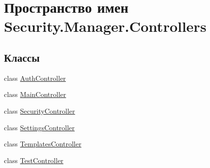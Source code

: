 \hypertarget{namespace_security_1_1_manager_1_1_controllers}{}\section{Пространство имен Security.\+Manager.\+Controllers}
\label{namespace_security_1_1_manager_1_1_controllers}
\subsection*{Классы}
\begin{DoxyCompactItemize}
\item 
class \hyperlink{class_security_1_1_manager_1_1_controllers_1_1_auth_controller}{Auth\+Controller}
\item 
class \hyperlink{class_security_1_1_manager_1_1_controllers_1_1_main_controller}{Main\+Controller}
\item 
class \hyperlink{class_security_1_1_manager_1_1_controllers_1_1_security_controller}{Security\+Controller}
\item 
class \hyperlink{class_security_1_1_manager_1_1_controllers_1_1_settings_controller}{Settings\+Controller}
\item 
class \hyperlink{class_security_1_1_manager_1_1_controllers_1_1_templates_controller}{Templates\+Controller}
\item 
class \hyperlink{class_security_1_1_manager_1_1_controllers_1_1_test_controller}{Test\+Controller}
\end{DoxyCompactItemize}
